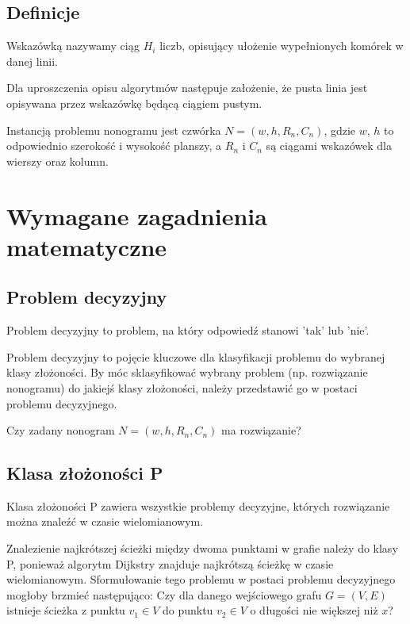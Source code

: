 \subsection{Definicje}
\begin{definition}
    Wskazówką nazywamy ciąg $H_i$ liczb, opisujący ułożenie wypełnionych komórek w danej linii.
\end{definition}
\begin{remark}
    Dla uproszczenia opisu algorytmów następuje założenie, że pusta linia jest opisywana przez
wskazówkę będącą ciągiem pustym.
\end{remark}
\begin{definition}
    Instancją problemu nonogramu jest czwórka $N = (w, h, R_n, C_n)$, gdzie $w$, $h$ to odpowiednio
szerokość i wysokość planszy, a $R_n$ i $C_n$ są ciągami wskazówek dla wierszy oraz kolumn.
\end{definition}



\section{Wymagane zagadnienia matematyczne}


\subsection{Problem decyzyjny}
\begin{definition}
    Problem decyzyjny to problem, na który odpowiedź stanowi 'tak' lub 'nie'.
\end{definition}
    Problem decyzyjny to pojęcie kluczowe dla klasyfikacji problemu do wybranej klasy złożoności.
By móc sklasyfikować wybrany problem (np. rozwiązanie nonogramu) do jakiejś klasy złożoności,
należy przedstawić go w postaci problemu decyzyjnego.
\begin{example}
    Czy zadany nonogram $N = (w, h, R_n, C_n)$ ma rozwiązanie?
\end{example}


\subsection{Klasa złożoności P}
\begin{definition}
    Klasa złożoności P zawiera wszystkie problemy decyzyjne, których rozwiązanie można znaleźć w czasie wielomianowym.
\end{definition}
\begin{example}
    Znalezienie najkrótszej ścieżki między dwoma punktami w grafie należy do klasy P, ponieważ
algorytm Dijkstry znajduje najkrótszą ścieżkę w czasie wielomianowym. Sformułowanie tego problemu
w postaci problemu decyzyjnego mogłoby brzmieć następująco: Czy dla danego wejściowego grafu $G = (V, E)$
istnieje ścieżka z punktu $v_1 \in V$ do punktu $v_2 \in V$ o długości nie większej niż $x$?
\end{example}


